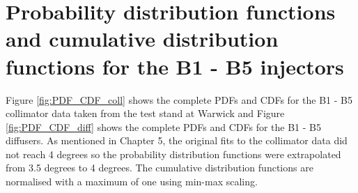 \begin{figure}[!htb]
    
\end{figure}


\section{Probability distribution functions and cumulative distribution functions for the B1 - B5 injectors}

Figure \ref{fig:PDF_CDF_coll} shows the complete PDFs and CDFs for the B1 - B5 collimator data taken from the test stand at Warwick and Figure \ref{fig:PDF_CDF_diff} shows the complete PDFs and CDFs for the B1 - B5 diffusers. As mentioned in Chapter 5, the original fits to the collimator data did not reach 4 degrees so the probability distribution functions were extrapolated from 3.5 degrees to 4 degrees. The cumulative distribution functions are normalised with a maximum of one using min-max scaling.

